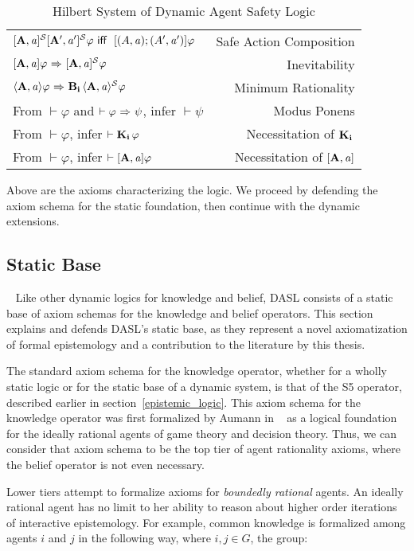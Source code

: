 \begin{table}[H]
\begin{center}
\begin{tabular}{| l r |}
    $\mathbf{[A,\mathit{a}]^\mathcal{S}}\mathbf{[A',\mathit{a}']^\mathcal{S}}\varphi \textsf{\ iff \ } [(A,\mathit{a});(A',\mathit{a}')]\varphi$ & Safe Action Composition \\
    $\mathbf{[A,\mathit{a}]}\varphi {\ \Rightarrow \ } \mathbf{[A,\mathit{a}]^\mathcal{S}}\varphi$ & Inevitability\\
    $\mathbf{\langle A,\mathit{a}\rangle}\varphi {\ \Rightarrow \ } \mathbf{B}_{\mathbf{i}}\,\mathbf{\langle A,\mathit{a}\rangle^\mathcal{S}}\varphi$ & Minimum Rationality\\
    From $\vdash \varphi$ and $\vdash \varphi {\ \Rightarrow \ } \psi$, infer $\vdash\psi$ & Modus Ponens\\
    From $\vdash \varphi$, infer $\vdash \mathbf{K}_{\mathbf{i}}\,\varphi$ & Necessitation of $\mathbf{K}_{\mathbf{i}}\,$\\
    From $\vdash \varphi$, infer $\vdash \mathbf{[A,\mathit{a}]}\varphi$ & Necessitation of $\mathbf{[A,\mathit{a}]}$\\
	\hline
\end{tabular}
\caption{Hilbert System of Dynamic Agent Safety Logic}
\end{center}
\end{table}

Above are the axioms characterizing the logic. We proceed by defending the axiom schema for the static foundation, then continue with the dynamic extensions.

\subsection{Static Base}~\label{static}
Like other dynamic logics for knowledge and belief, DASL consists of a static base of axiom schemas for the knowledge and belief operators. This section explains and defends DASL's static base, as they represent a novel axiomatization of formal epistemology and a contribution to the literature by this thesis. 

The standard axiom schema for the knowledge operator, whether for a wholly static logic or for the static base of a dynamic system, is that of the S5 operator, described earlier in section~\ref{epistemic_logic}. This axiom schema for the knowledge operator was first formalized by Aumann in ~\cite{Aumann} as a logical foundation for the ideally rational agents of game theory and decision theory. Thus, we can consider that axiom schema to be the top tier of agent rationality axioms, where the belief operator is not even necessary.

Lower tiers attempt to formalize axioms for \emph{boundedly rational} agents. An ideally rational agent has no limit to her ability to reason about higher order iterations of interactive epistemology. For example, common knowledge is formalized among agents $i$ and $j$ in the following way, where $i,j\in G$, the group:

